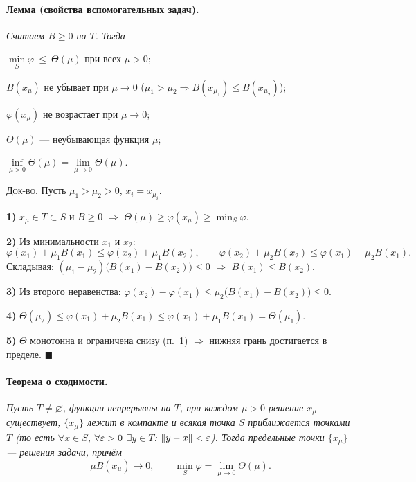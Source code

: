 \paragraph{Лемма (свойства вспомогательных задач).}
\textit{Считаем $B \ge 0$ на $T$. Тогда}
\begin{csteps}
  \item $\min\limits_{S}\varphi \ \le\ \Theta(\mu)$ при всех $\mu > 0$;
  \item $B(x_\mu)$ не убывает при $\mu \to 0$
        ($\mu_1 > \mu_2 \Rightarrow B(x_{\mu_1}) \le B(x_{\mu_2})$);
  \item $\varphi(x_\mu)$ не возрастает при $\mu \to 0$;
  \item $\Theta(\mu)$ — неубывающая функция $\mu$;
  \item $\inf\limits_{\mu>0}\Theta(\mu) = \lim\limits_{\mu\to0}\Theta(\mu)$.
\end{csteps}

\textsc{Док-во.} Пусть $\mu_1 > \mu_2 > 0$, $x_i = x_{\mu_i}$.

\textbf{1)} $x_\mu \in T \subset S$ и $B \ge 0$ $\Rightarrow$
$\Theta(\mu) \ge \varphi(x_\mu) \ge \min_S\varphi$.

\textbf{2)} Из минимальности $x_1$ и $x_2$:
\[
  \varphi(x_1) + \mu_1 B(x_1) \le \varphi(x_2) + \mu_1 B(x_2) , \qquad
  \varphi(x_2) + \mu_2 B(x_2) \le \varphi(x_1) + \mu_2 B(x_1) .
\]
Складывая: $(\mu_1 - \mu_2)\big(B(x_1) - B(x_2)\big) \le 0$ $\Rightarrow$
$B(x_1) \le B(x_2)$.

\textbf{3)} Из второго неравенства:
$\varphi(x_2) - \varphi(x_1) \le \mu_2\big(B(x_1)-B(x_2)\big) \le 0$.

\textbf{4)}
$\Theta(\mu_2) \le \varphi(x_1) + \mu_2 B(x_1)
 \le \varphi(x_1) + \mu_1 B(x_1) = \Theta(\mu_1)$.

\textbf{5)} $\Theta$ монотонна и ограничена снизу (п.~1) $\Rightarrow$
нижняя грань достигается в пределе. $\blacksquare$

\paragraph{Теорема о сходимости.}
\textit{Пусть $T \ne \varnothing$, функции непрерывны на $T$, при каждом
$\mu > 0$ решение $x_\mu$ существует, $\{x_\mu\}$ лежит в компакте и всякая
точка $S$ приближается точками $T$ (то есть $\forall x \in S$,
$\forall\varepsilon > 0$ $\exists y \in T$: $\left\lVert y - x \right\rVert < \varepsilon$). Тогда предельные
точки $\{x_\mu\}$ — решения задачи, причём}
\[
  \mu B(x_\mu) \to 0 , \qquad
  \min_S \varphi = \lim_{\mu\to0}\Theta(\mu) .
\]

